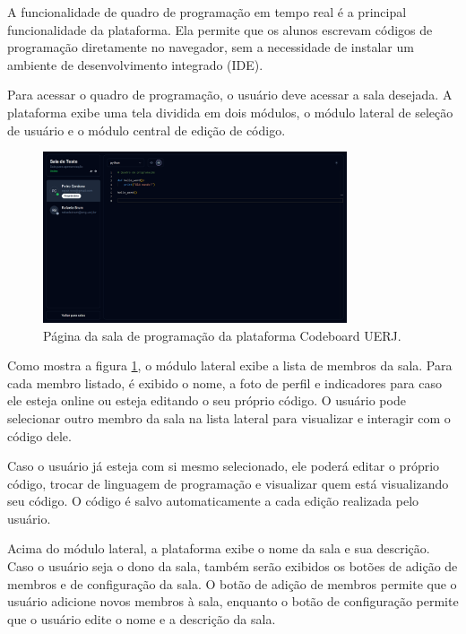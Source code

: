 A funcionalidade de quadro de programação em tempo real é a principal funcionalidade da plataforma. Ela permite que os alunos escrevam códigos de programação diretamente no navegador, sem a necessidade de instalar um ambiente de desenvolvimento integrado (IDE).

Para acessar o quadro de programação, o usuário deve acessar a sala desejada. A plataforma exibe uma tela dividida em dois módulos, o módulo lateral de seleção de usuário e o módulo central de edição de código.

\begin{figure}[H]
    \centering
    \includegraphics[width=0.8\textwidth]{assets/codeboard/room-details-page.png}
    \caption{Página da sala de programação da plataforma Codeboard UERJ.}
    \label{fig:room-details-page}
\end{figure}


Como mostra a figura \ref{fig:room-details-page}, o módulo lateral exibe a lista de membros da sala. Para cada membro listado, é exibido o nome, a foto de perfil e indicadores para caso ele esteja online ou esteja editando o seu próprio código. O usuário pode selecionar outro membro da sala na lista lateral para visualizar e interagir com o código dele.

Caso o usuário já esteja com si mesmo selecionado, ele poderá editar o próprio código, trocar de linguagem de programação e visualizar quem está visualizando seu código. O código é salvo automaticamente a cada edição realizada pelo usuário.

Acima do módulo lateral, a plataforma exibe o nome da sala e sua descrição. Caso o usuário seja o dono da sala, também serão exibidos os botões de adição de membros e de configuração da sala. O botão de adição de membros permite que o usuário adicione novos membros à sala, enquanto o botão de configuração permite que o usuário edite o nome e a descrição da sala.

